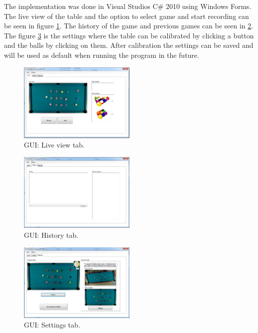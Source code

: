 The implementation was done in Visual Studios C\# 2010 using Windows Forms. The live view of the table and the option to select game and start recording can be seen in figure \ref{fig:guilive}. The history of the game and previous games can be seen in \ref{fig:guihist}. The figure \ref{fig:guisett} is the settings where the table can be calibrated by clicking a button and the balls by clicking on them. After calibration the settings can be saved and will be used as default when running the program in the future.

\begin{figure}[htpb]
\begin{center}
\leavevmode
\includegraphics[width=0.5\textwidth]{images/prototype/live}
\end{center}
\caption{GUI: Live view tab.}
\label{fig:guilive}
\end{figure}

\begin{figure}[htpb]
\begin{center}
\leavevmode
\includegraphics[width=0.5\textwidth]{images/prototype/hist}
\end{center}
\caption{GUI: History tab.}
\label{fig:guihist}
\end{figure}

\begin{figure}[htpb]
\begin{center}
\leavevmode
\includegraphics[width=0.5\textwidth]{images/prototype/settings}
\end{center}
\caption{GUI: Settings tab.}
\label{fig:guisett}
\end{figure}